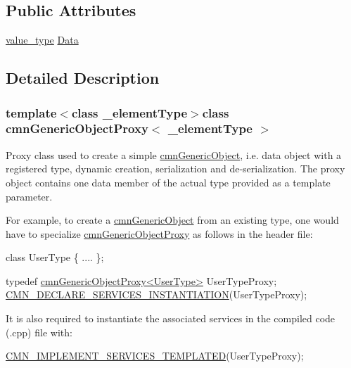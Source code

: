 \subsection*{Public Attributes}
\begin{DoxyCompactItemize}
\item 
\hyperlink{classcmn_generic_object_proxy_a5a3db96e5acd73055d5d34c25c1635f3}{value\-\_\-type} \hyperlink{classcmn_generic_object_proxy_a1c215839c40dbb71a7e2609b71a80f71}{Data}
\end{DoxyCompactItemize}


\subsection{Detailed Description}
\subsubsection*{template$<$class \-\_\-element\-Type$>$class cmn\-Generic\-Object\-Proxy$<$ \-\_\-element\-Type $>$}

Proxy class used to create a simple \hyperlink{classcmn_generic_object}{cmn\-Generic\-Object}, i.\-e. data object with a registered type, dynamic creation, serialization and de-\/serialization. The proxy object contains one data member of the actual type provided as a template parameter.

For example, to create a \hyperlink{classcmn_generic_object}{cmn\-Generic\-Object} from an existing type, one would have to specialize \hyperlink{classcmn_generic_object_proxy}{cmn\-Generic\-Object\-Proxy} as follows in the header file\-: 
\begin{DoxyCode}
\textcolor{keyword}{class }UserType \{
    ....
\};

\textcolor{keyword}{typedef} \hyperlink{classcmn_generic_object_proxy}{cmnGenericObjectProxy<UserType>} UserTypeProxy;
\hyperlink{cmn_class_register_macros_8h_a198d81818e0b66ebe53e692dc7c5d058}{CMN\_DECLARE\_SERVICES\_INSTANTIATION}(UserTypeProxy);
\end{DoxyCode}


It is also required to instantiate the associated services in the compiled code (.cpp) file with\-: 
\begin{DoxyCode}
\hyperlink{cmn_class_register_macros_8h_a6d3e8cb412f66ff7e73f3ab52290f471}{CMN\_IMPLEMENT\_SERVICES\_TEMPLATED}(UserTypeProxy);
\end{DoxyCode}



